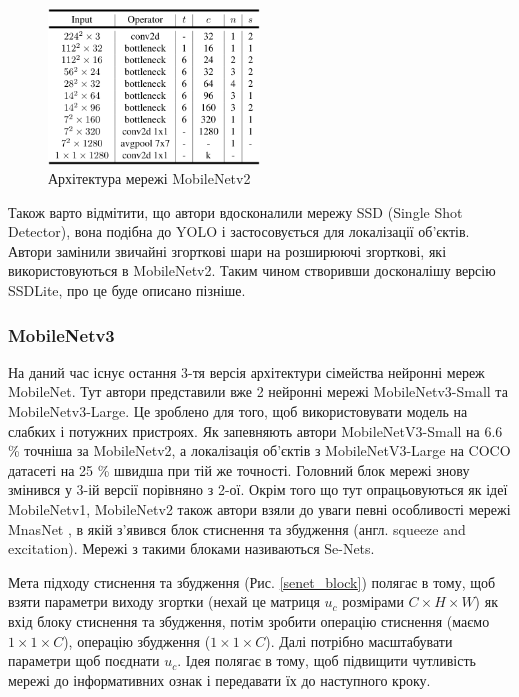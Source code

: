 \begin{figure}[H]
    \centering
    \includegraphics[width=0.5\textwidth]{images/cnn_mobilenetv2_architecture}
    \caption{Архітектура мережі MobileNetv2     \cite{mobilenetv2}
        \label{fig:cnn:mobilenetv2_architecture}
    }
\end{figure}


Також варто відмітити, що автори вдосконалили мережу SSD (Single Shot Detector), вона подібна
до YOLO і застосовується для локалізації об'єктів. Автори замінили звичайні згорткові шари
на розширюючі згорткові, які використовуються в MobileNetv2. Таким чином створивши досконалішу
версію SSDLite, про це буде описано пізніше.

\subsubsection{MobileNetv3}

На даний час існує остання 3-тя версія \cite{mobilenetv3} архітектури сімейства нейронні мереж MobileNet.
Тут автори представили вже 2 нейронні мережі MobileNetv3-Small та MobileNetv3-Large.
Це зроблено для того, щоб використовувати модель на слабких і потужних пристроях.
Як запевняють автори MobileNetV3-Small на 6.6 \% точніша за MobileNetv2, а локалізація об'єктів
з MobileNetV3-Large на COCO датасеті на 25 \% швидша при тій же точності.
Головний блок мережі знову змінився у 3-ій версії порівняно з 2-ої.
Окрім того що тут опрацьовуються як ідеї MobileNetv1, MobileNetv2 також автори взяли
до уваги певні особливості мережі MnasNet \cite{mnasnet}, в якій з'явився блок стиснення та збудження
(англ. squeeze and excitation). Мережі з такими блоками називаються Se-Nets.

Мета підходу стиснення та збудження (Рис. \ref{senet_block}) полягає в тому, щоб взяти параметри 
виходу згортки (нехай це матриця $u_c$ розмірами $C \times H \times W$)
як вхід блоку стиснення та збудження,
потім зробити операцію стиснення (маємо $1 \times 1 \times C$), операцію збудження ($1 \times 1 \times C$). 
Далі потрібно масштабувати параметри щоб поєднати $u_c$.
Ідея полягає в тому, щоб підвищити чутливість мережі до інформативних ознак і передавати їх
до наступного кроку.

